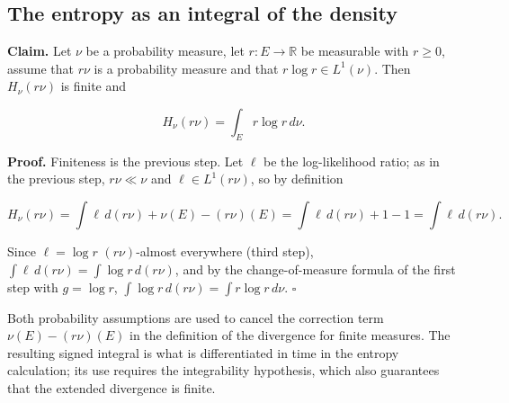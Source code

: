 \documentclass[11pt,a4paper]{report}
\begin{document}
\subsection{\texorpdfstring{The entropy as an integral of the density}{The entropy as an integral of the density}}
\label{report-step-UnadjustedLangevin-LSI-KLOfDensity-lean-5}


\textbf{Claim.} Let \(\nu\) be a probability measure, let \(r:E\to\mathbb R\) be measurable with \(r\ge0\), assume that \(r\nu\) is a probability measure and that \(r\log r\in L^1(\nu)\). Then \(H_\nu(r\nu)\) is finite and


\[H_\nu(r\nu)=\int_Er\log r\,d\nu.\]


\textbf{Proof.} Finiteness is the previous step. Let \(\ell\) be the log-likelihood ratio; as in the previous step, \(r\nu\ll\nu\) and \(\ell\in L^1(r\nu)\), so by definition


\[H_\nu(r\nu)=\int\ell\,d(r\nu)+\nu(E)-(r\nu)(E)=\int\ell\,d(r\nu)+1-1=\int\ell\,d(r\nu).\]


Since \(\ell=\log r\) \((r\nu)\)-almost everywhere (third step), \(\int\ell\,d(r\nu)=\int\log r\,d(r\nu)\), and by the change-of-measure formula of the first step with \(g=\log r\), \(\int\log r\,d(r\nu)=\int r\log r\,d\nu\). \(\square\)




Both probability assumptions are used to cancel the correction term \(\nu(E)-(r\nu)(E)\) in the definition of the divergence for finite measures. The resulting signed integral is what is differentiated in time in the entropy calculation; its use requires the integrability hypothesis, which also guarantees that the extended divergence is finite.
\end{document}
